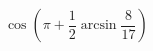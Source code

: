 \begin{ex}[type=simplify_calculate]
	\begin{condition}
		\( \cos\left( \pi+\dfrac{1}{2}\arcsin\dfrac{8}{17} \right) \)
	\end{condition}
\end{ex}